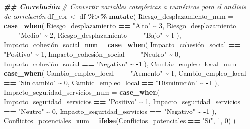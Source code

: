 \documentclass[
]{article}
\newenvironment{Shaded}{\begin{snugshade}}{\end{snugshade}}
\newcommand{\AttributeTok}[1]{\textcolor[rgb]{0.13,0.29,0.53}{#1}}
\newcommand{\CommentTok}[1]{\textcolor[rgb]{0.56,0.35,0.01}{\textit{#1}}}
\newcommand{\DecValTok}[1]{\textcolor[rgb]{0.00,0.00,0.81}{#1}}
\newcommand{\DocumentationTok}[1]{\textcolor[rgb]{0.56,0.35,0.01}{\textbf{\textit{#1}}}}
\newcommand{\FunctionTok}[1]{\textcolor[rgb]{0.13,0.29,0.53}{\textbf{#1}}}
\newcommand{\NormalTok}[1]{#1}
\newcommand{\OtherTok}[1]{\textcolor[rgb]{0.56,0.35,0.01}{#1}}
\newcommand{\SpecialCharTok}[1]{\textcolor[rgb]{0.81,0.36,0.00}{\textbf{#1}}}
\newcommand{\StringTok}[1]{\textcolor[rgb]{0.31,0.60,0.02}{#1}}
\begin{document}
\begin{Shaded}
\begin{Highlighting}[]
\DocumentationTok{\#\# Correlación}
\CommentTok{\# Convertir variables categóricas a numéricas para el análisis de correlación}
\NormalTok{df\_cor }\OtherTok{\textless{}{-}}\NormalTok{ df }\SpecialCharTok{\%\textgreater{}\%}
  \FunctionTok{mutate}\NormalTok{(}
    \AttributeTok{Riesgo\_desplazamiento\_num =} \FunctionTok{case\_when}\NormalTok{(}
\NormalTok{      Riesgo\_desplazamiento }\SpecialCharTok{==} \StringTok{"Alto"} \SpecialCharTok{\textasciitilde{}} \DecValTok{3}\NormalTok{,}
\NormalTok{      Riesgo\_desplazamiento }\SpecialCharTok{==} \StringTok{"Medio"} \SpecialCharTok{\textasciitilde{}} \DecValTok{2}\NormalTok{,}
\NormalTok{      Riesgo\_desplazamiento }\SpecialCharTok{==} \StringTok{"Bajo"} \SpecialCharTok{\textasciitilde{}} \DecValTok{1}
\NormalTok{    ),}
\NormalTok{    Impacto\_cohesión}\AttributeTok{\_social\_num =} \FunctionTok{case\_when}\NormalTok{(}
\NormalTok{      Impacto\_cohesión\_social }\SpecialCharTok{==} \StringTok{"Positivo"} \SpecialCharTok{\textasciitilde{}} \DecValTok{1}\NormalTok{,}
\NormalTok{      Impacto\_cohesión\_social }\SpecialCharTok{==} \StringTok{"Neutro"} \SpecialCharTok{\textasciitilde{}} \DecValTok{0}\NormalTok{,}
\NormalTok{      Impacto\_cohesión\_social }\SpecialCharTok{==} \StringTok{"Negativo"} \SpecialCharTok{\textasciitilde{}} \SpecialCharTok{{-}}\DecValTok{1}
\NormalTok{    ),}
    \AttributeTok{Cambio\_empleo\_local\_num =} \FunctionTok{case\_when}\NormalTok{(}
\NormalTok{      Cambio\_empleo\_local }\SpecialCharTok{==} \StringTok{"Aumento"} \SpecialCharTok{\textasciitilde{}} \DecValTok{1}\NormalTok{,}
\NormalTok{      Cambio\_empleo\_local }\SpecialCharTok{==} \StringTok{"Sin cambio"} \SpecialCharTok{\textasciitilde{}} \DecValTok{0}\NormalTok{,}
\NormalTok{      Cambio\_empleo\_local }\SpecialCharTok{==} \StringTok{"Disminución"} \SpecialCharTok{\textasciitilde{}} \SpecialCharTok{{-}}\DecValTok{1}
\NormalTok{    ),}
    \AttributeTok{Impacto\_seguridad\_servicios\_num =} \FunctionTok{case\_when}\NormalTok{(}
\NormalTok{      Impacto\_seguridad\_servicios }\SpecialCharTok{==} \StringTok{"Positivo"} \SpecialCharTok{\textasciitilde{}} \DecValTok{1}\NormalTok{,}
\NormalTok{      Impacto\_seguridad\_servicios }\SpecialCharTok{==} \StringTok{"Neutro"} \SpecialCharTok{\textasciitilde{}} \DecValTok{0}\NormalTok{,}
\NormalTok{      Impacto\_seguridad\_servicios }\SpecialCharTok{==} \StringTok{"Negativo"} \SpecialCharTok{\textasciitilde{}} \SpecialCharTok{{-}}\DecValTok{1}
\NormalTok{    ),}
    \AttributeTok{Conflictos\_potenciales\_num =} \FunctionTok{ifelse}\NormalTok{(Conflictos\_potenciales }\SpecialCharTok{==} \StringTok{"Sí"}\NormalTok{, }\DecValTok{1}\NormalTok{, }\DecValTok{0}\NormalTok{)}
\NormalTok{  )}


\end{Highlighting}
\end{Shaded}
\end{document}

